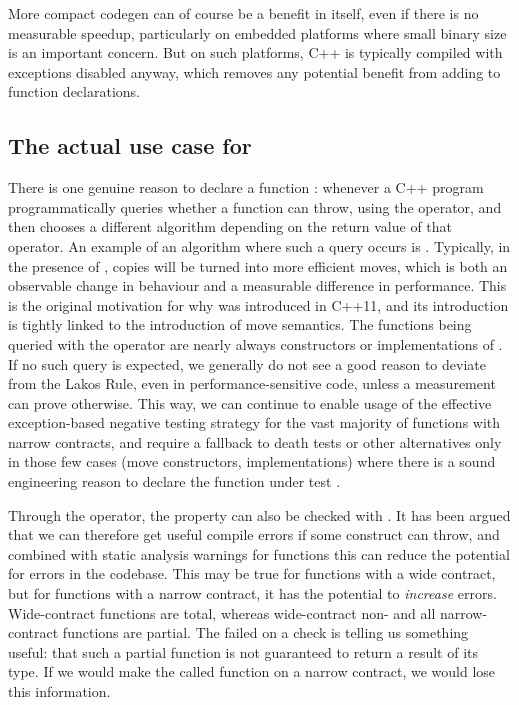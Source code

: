 More compact codegen can of course be a benefit in itself, even if there is no measurable speedup, particularly on embedded platforms where small binary size is an important concern. But on such platforms, C++ is typically compiled with exceptions disabled anyway, which removes any potential benefit from adding  to function declarations.

\subsection{The actual use case for }

There is one genuine reason to declare a function : whenever a C++ program programmatically queries whether a function can throw, using the  operator, and then chooses a different algorithm depending on the return value of that operator. An example of an algorithm where such a query occurs is . Typically, in the presence of , copies will be turned into more efficient moves, which is both an observable change in behaviour and a measurable difference in performance. This is the original motivation for why  was introduced in C++11, and its introduction is tightly linked to the introduction of move semantics. The functions being queried with the  operator are nearly always constructors or implementations of . If no such query is expected, we generally do not see a good reason to deviate from the Lakos Rule, even in performance-sensitive code, unless a measurement can prove otherwise. This way, we can continue to enable usage of the effective exception-based negative testing strategy for the vast majority of functions with narrow contracts, and require a fallback to death tests or other alternatives only in those few cases (move constructors,  implementations) where there is a sound engineering reason to declare the function under test .

Through the  operator, the  property can also be checked with . It has been argued that we can therefore get useful compile errors if some construct can throw, and combined with static analysis warnings for  functions this can reduce the potential for errors in the codebase. This may be true for functions with a wide contract, but for functions with a narrow contract, it has the potential to \emph{increase} errors. Wide-contract  functions are total, whereas wide-contract non- and all narrow-contract functions are partial. The failed  on a  check is telling us something useful: that such a partial function is not guaranteed to return a result of its type. If we would make the called function  on a narrow contract, we would lose this information.

